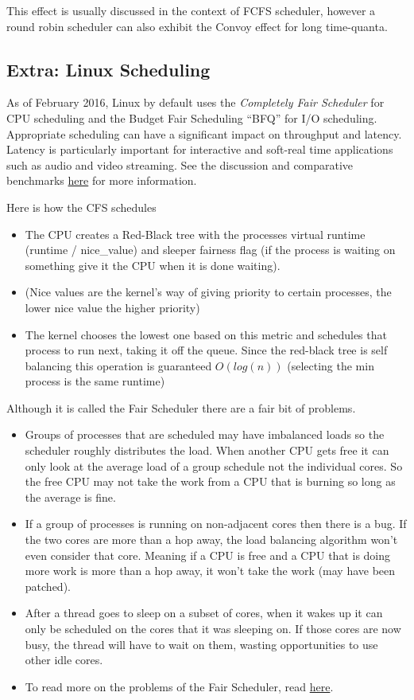 This effect is usually discussed in the context of FCFS scheduler, however a round robin scheduler can also exhibit the Convoy effect for long time-quanta.

\subsection{Extra: Linux Scheduling}

As of February 2016, Linux by default uses the \emph{Completely Fair Scheduler} for CPU scheduling and the Budget Fair Scheduling ``BFQ'' for I/O scheduling. Appropriate scheduling can have a significant impact on throughput and latency. Latency is particularly important for interactive and soft-real time applications such as audio and video streaming. See the discussion and comparative benchmarks \href{https://lkml.org/lkml/2014/5/27/314}{here} for more information.

Here is how the CFS schedules

\begin{itemize}
\tightlist
\item
  The CPU creates a Red-Black tree with the processes virtual runtime (runtime / nice\_value) and sleeper fairness flag (if the process is waiting on something give it the CPU when it is done waiting).
\item
  (Nice values are the kernel's way of giving priority to certain processes, the lower nice value the higher priority)
\item
  The kernel chooses the lowest one based on this metric and schedules that process to run next, taking it off the queue. Since the red-black tree is self balancing this operation is guaranteed \(O(log(n))\) (selecting the min process is the same runtime)
\end{itemize}

Although it is called the Fair Scheduler there are a fair bit of problems.

\begin{itemize}
\tightlist
\item
  Groups of processes that are scheduled may have imbalanced loads so the scheduler roughly distributes the load. When another CPU gets free it can only look at the average load of a group schedule not the individual cores. So the free CPU may not take the work from a CPU that is burning so long as the average is fine.
\item
  If a group of processes is running on non-adjacent cores then there is a bug. If the two cores are more than a hop away, the load balancing algorithm won't even consider that core. Meaning if a CPU is free and a CPU that is doing more work is more than a hop away, it won't take the work (may have been patched).
\item
  After a thread goes to sleep on a subset of cores, when it wakes up it can only be scheduled on the cores that it was sleeping on. If those cores are now busy, the thread will have to wait on them, wasting opportunities to use other idle cores.
\item
  To read more on the problems of the Fair Scheduler, read \href{https://blog.acolyer.org/2016/04/26/the-linux-scheduler-a-decade-of-wasted-cores}{here}.
\end{itemize}

